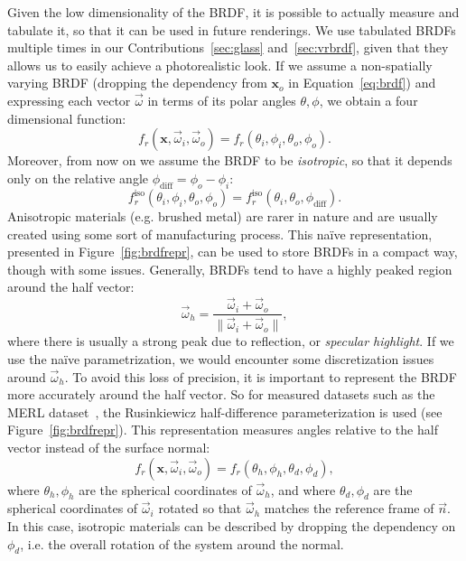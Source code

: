 Given the low dimensionality of the BRDF, it is possible to actually measure and tabulate it, so that it can be used in future renderings. We use tabulated BRDFs multiple times in our Contributions~\ref{sec:glass} and~\ref{sec:vrbrdf}, given that they allows us to easily achieve a photorealistic look. If we assume a non-spatially varying BRDF (dropping the dependency from $\mathbf{x}_o$ in Equation~\ref{eq:brdf}) and expressing each vector $\vec{\omega}$ in terms of its polar angles $\theta, \phi$, we obtain a four dimensional function:
\begin{equation*}
f_r(\mathbf{x}, \vec{\omega}_i,  \vec{\omega}_o) = f_r(\theta_i, \phi_i, \theta_o, \phi_o).
\end{equation*}
Moreover, from now on we assume the BRDF to be \emph{isotropic}, so that it depends only on the relative angle $\phi_\text{diff} = \phi_o - \phi_i$:
\begin{equation*}
f_r^\text{iso}(\theta_i, \phi_i, \theta_o, \phi_o) = f_r^\text{iso}(\theta_i, \theta_o, \phi_\text{diff}).
\end{equation*}
Anisotropic materials (e.g. brushed metal) are rarer in nature and are usually created using some sort of manufacturing process.
This na\"ive representation, presented in Figure~\ref{fig:brdfrepr}, can be used to store BRDFs in a compact way, though with some issues. Generally, BRDFs tend to have a highly peaked region around the half vector:
\begin{equation*}\vec{\omega}_h = \frac{\vec{\omega}_i + \vec{\omega}_o}{\|\vec{\omega}_i + \vec{\omega}_o\|},
\end{equation*}
where there is usually a strong peak due to reflection, or \emph{specular highlight}. If we use the na\"ive parametrization, we would encounter some discretization issues around $\vec{\omega}_h$. To avoid this loss of precision, it is important to represent the BRDF more accurately around the half vector. So for measured datasets such as the MERL dataset~\cite{Matusik2003}, the Rusinkiewicz half-difference parameterization is used (see Figure~\ref{fig:brdfrepr}). This representation measures angles relative to the half vector instead of the surface normal:
\begin{equation*}
f_r(\mathbf{x}, \vec{\omega}_i,  \vec{\omega}_o) = f_r(\theta_h, \phi_h, \theta_d, \phi_d),
\end{equation*}
where $\theta_h, \phi_h$ are the spherical coordinates of $\vec{\omega}_h$, and where $\theta_d, \phi_d$ are the spherical coordinates of $\vec{\omega}_i$ rotated so that $\vec{\omega}_h$ matches the reference frame of $\vec{n}$. In this case,  isotropic materials can be described by dropping the dependency on $\phi_d$, i.e. the overall rotation of the system around the normal.

